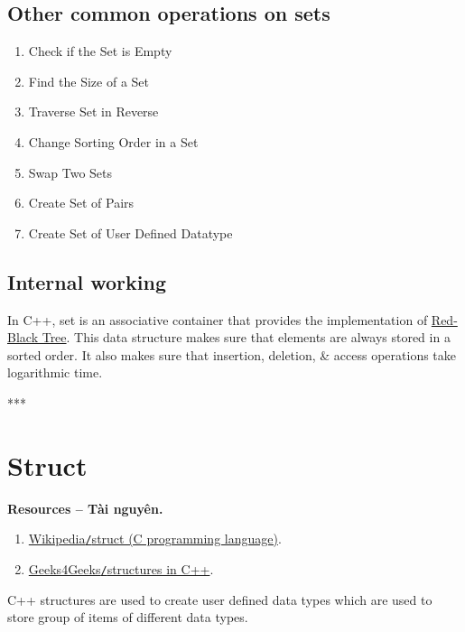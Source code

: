 \documentclass{article}
\begin{document}

\subsection{Other common operations on sets}
\begin{enumerate}
	\item Check if the Set is Empty
	\item Find the Size of a Set
	\item Traverse Set in Reverse
	\item Change Sorting Order in a Set
	\item Swap Two Sets
	\item Create Set of Pairs
	\item Create Set of User Defined Datatype
\end{enumerate}


\subsection{Internal working}
In C++, set is an associative container that provides the implementation of \href{https://www.geeksforgeeks.org/red-black-tree-in-cpp/}{Red-Black Tree}. This data structure makes sure that elements are always stored in a sorted order. It also makes sure that insertion, deletion, \& access operations take logarithmic time.

***


\section{Struct}
\textbf{\textsf{Resources -- Tài nguyên.}}
\begin{enumerate}
	\item \href{https://en.wikipedia.org/wiki/Struct_(C_programming_language)}{Wikipedia{\tt/}struct (C programming language)}.
	\item \href{https://www.geeksforgeeks.org/structures-in-cpp/}{Geeks4Geeks{\tt/}structures in C++}.
\end{enumerate}
C++ structures are used to create user defined data types which are used to store group of items of different data types.
\end{document}
